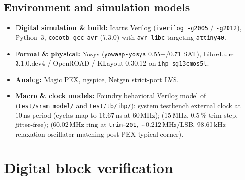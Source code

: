 \documentclass[10pt,a4paper]{article}
\begin{document}
\subsection{Environment and simulation models}

\begin{itemize}
\item \textbf{Digital simulation \& build:} Icarus Verilog (\texttt{iverilog -g2005} / \texttt{-g2012}), Python~3,
\texttt{cocotb}, \texttt{gcc-avr} (7.3.0) with \texttt{avr-libc} targeting \texttt{attiny40}.
\item \textbf{Formal \& physical:} Yosys (\texttt{yowasp-yosys} 0.55+/0.71 SAT), LibreLane 3.1.0.dev4 / OpenROAD /
KLayout 0.30.12 on \texttt{ihp-sg13cmos5l}.
\item \textbf{Analog:} Magic PEX, ngspice, Netgen strict-port LVS.
\item \textbf{Macro \& clock models:} Foundry behavioral Verilog model of
 (\texttt{test/sram\_model/} and \texttt{test/tb/ihp/}); system
testbench external clock at 10\,ns period (cycles map to 16.67\,ns at 60\,MHz); 
(15\,MHz, 0.5\,\% trim step, jitter-free);  (60.02\,MHz ring at
\texttt{trim=201}, $\sim$0.212\,MHz/LSB, 98.60\,kHz relaxation oscillator matching post-PEX typical corner).
\end{itemize}

\section{Digital block verification}\label{sec:blocks}
\end{document}
